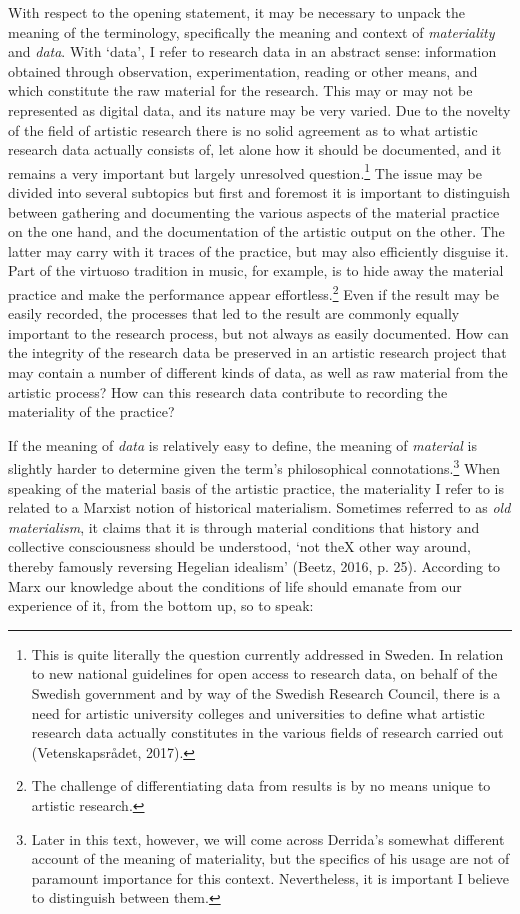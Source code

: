With respect to the opening statement, it may be necessary to unpack the
meaning of the terminology, specifically the meaning and context of
\emph{materiality} and \emph{data}. With `data', I refer to research
data in an abstract sense: information obtained through observation,
experimentation, reading or other means, and which constitute the raw
material for the research. This may or may not be represented as digital
data, and its nature may be very varied. Due to the novelty of the field
of artistic research there is no solid agreement as to what artistic
research data actually consists of, let alone how it should be
documented, and it remains a very important but largely unresolved
question.\footnote{This is quite literally the question currently
  addressed in Sweden. In relation to new national guidelines for open
  access to research data, on behalf of the Swedish government and by
  way of the Swedish Research Council, there is a need for artistic
  university colleges and universities to define what artistic research
  data actually constitutes in the various fields of research carried
  out (Vetenskapsrådet, 2017).} The issue may be divided into several
subtopics but first and foremost it is important to distinguish between
gathering and documenting the various aspects of the material practice
on the one hand, and the documentation of the artistic output on the
other. The latter may carry with it traces of the practice, but may also
efficiently disguise it. Part of the virtuoso tradition in music, for
example, is to hide away the material practice and make the performance
appear effortless.\footnote{The challenge of differentiating data from
  results is by no means unique to artistic research.} Even if the
result may be easily recorded, the processes that led to the result are
commonly equally important to the research process, but not always as
easily documented. How can the integrity of the research data be
preserved in an artistic research project that may contain a number of
different kinds of data, as well as raw material from the artistic
process? How can this research data contribute to recording the
materiality of the practice?

If the meaning of \emph{data} is relatively easy to define, the meaning
of \emph{material} is slightly harder to determine given the term's
philosophical connotations.\footnote{Later in this text, however, we
  will come across Derrida's somewhat different account of the meaning
  of materiality, but the specifics of his usage are not of paramount
  importance for this context. Nevertheless, it is important I believe
  to distinguish between them.} When speaking of the material basis of
the artistic practice, the materiality I refer to is related to a
Marxist notion of historical materialism. Sometimes referred to as
\emph{old materialism}, it claims that it is through material conditions
that history and collective consciousness should be understood, `not theX
other way around, thereby famously reversing Hegelian idealism' (Beetz,
2016, p. 25). According to Marx our knowledge about the conditions of
life should emanate from our experience of it, from the bottom up, so to
speak:

